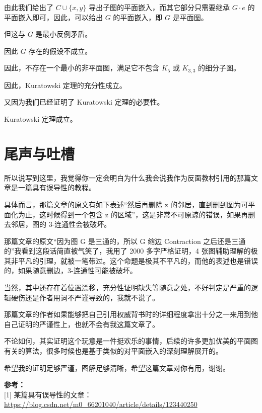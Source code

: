 \documentclass[11pt, a4paper]{ctexart}
\begin{document}
由此我们给出了 $C\cup \{x,y\}$ 导出子图的平面嵌入，而其它部分只需要继承 $G\cdot e$ 的平面嵌入即可，因此，可以给出 $G$ 的平面嵌入，即 $G$ 是平面图。

但这与 $G$ 是最小反例矛盾。

因此 $G$ 存在的假设不成立。

因此，不存在一个最小的非平面图，满足它不包含 $K_5$ 或 $K_{3,3}$ 的细分子图。

因此，Kuratowski 定理的充分性成立。

又因为我们已经证明了 Kuratowski 定理的必要性。

Kuratowski 定理成立。

\section{尾声与吐槽}

所以说写到这里，我觉得你一定会明白为什么我会说我作为反面教材引用的那篇文章是一篇具有误导性的教程。

具体而言，那篇文章的原文有如下表述“然后再删除 z 的邻居，直到删到图为可平面化为止，这时候得到一个包含 z 的区域”，这是非常不可原谅的错误，如果再删去邻居，图的 3-连通性会被破坏。

那篇文章的原文“因为图 G 是三通的，所以 G 缩边 Contraction 之后还是三通的”我看到这段话简直被气笑了，我用了 2000 多字严格证明，4 张图辅助理解的极其非平凡的引理，就被一笔带过。这个命题是极其不平凡的，而他的表述也是错误的，如果随意删边，3-连通性可能被破坏。

当然，其中还存在着位置漂移，充分性证明缺失等随意之处，不好判定是严重的逻辑硬伤还是作者用词不严谨导致的，我就不说了。

那篇文章的作者如果能够把自己引用权威背书时的详细程度拿出十分之一来用到他自己证明的严谨性上，也就不会有我这篇文章了。

不论如何，其实证明这个玩意是一件挺欢乐的事情，后续的许多更加优美的平面图有关的算法，很多时候也是基于类似的对平面嵌入的深刻理解展开的。

希望我的证明足够严谨，图解足够清晰，希望这篇文章对你有用，谢谢。

\vspace{2em}
\noindent\textbf{参考：} \\
\footnotesize
\hypertarget{ref:csdn}{[1]} 某篇具有误导性的文章：\url{https://blog.csdn.net/m0_66201040/article/details/123440250}
\end{document}
